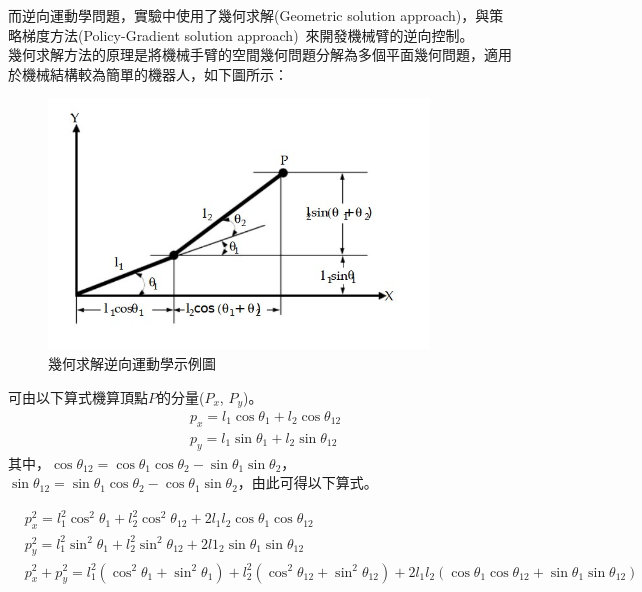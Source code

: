 \documentclass[class=NCU_thesis, crop=false]{standalone}
\begin{document}
而逆向運動學問題，實驗中使用了幾何求解(Geometric solution approach)，與策略梯度方法(Policy-Gradient solution approach)~\cite{dauce2010inverse}來開發機械臂的逆向控制。\\

幾何求解方法的原理是將機械手臂的空間幾何問題分解為多個平面幾何問題，適用於機械結構較為簡單的機器人，如下圖所示：

\begin{figure}[htbp]
    \centering
    \includegraphics[width=0.9\textwidth]{figures/IK.jpg}
\caption{幾何求解逆向運動學示例圖}
\end{figure}

可由以下算式機算頂點$P$的分量($P_{x}$, $P_{y}$)。
$$
\begin{aligned}
& p_{x}=l_1 \cos \theta_1+l_2 \cos \theta_{12} \\
& p_{y}=l_1 \sin \theta_1+l_2 \sin \theta_{12}
\end{aligned}
$$
其中，$\cos \theta_{12}=\cos \theta_{1} \cos \theta_{2}-\sin \theta_{1} \sin \theta_{2}$，$
\sin \theta_{12}=\sin \theta_{1} \cos \theta_{2}-\cos \theta_{1} \sin \theta_{2}$，由此可得以下算式。

$$
\begin{aligned}
& p_{x}^2=l_1^2 \cos^2 \theta_1+l_2^2 \cos^2 \theta_{12}+2 l_1 l_2 \cos \theta_1 \cos \theta_{12} \\
& p_{y}^2=l_1^2 \sin^2 \theta_1 + l_2^2 \sin^2 \theta_{12}+2 l1_2 \sin \theta_1 \sin \theta_{12} \\
& p_{x}^2+p_{y}^2=l_1^2\left(\cos^2 \theta_1+\sin^2 \theta_1\right)+l_2^2\left(\cos^2 \theta_{12}+\sin^2 \theta_{12}\right)+2l_1 l_2\left(\cos \theta_1 \cos \theta_{12}+\sin \theta_1 \sin \theta_{12}\right)
\end{aligned}
$$
\end{document}
